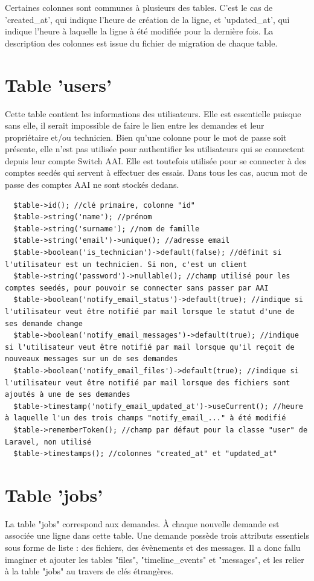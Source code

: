 \documentclass[
    iai, %
    eai, %
]{heig-tb}
\begin{document}
Certaines colonnes sont communes à plusieurs des tables. C'est le cas de 'created\_at', qui indique l'heure de création de la ligne, et 'updated\_at', qui indique l'heure à laquelle la ligne à été modifiée pour la dernière fois. La description des colonnes est issue du fichier de migration de chaque table.

\section{Table 'users'}
Cette table contient les informations des utilisateurs. Elle est essentielle puisque sans elle, il serait impossible de faire le lien entre les demandes et leur propriétaire et/ou technicien.
Bien qu'une colonne pour le mot de passe soit présente, elle n'est pas utilisée pour authentifier les utilisateurs qui se connectent depuis leur compte Switch AAI. Elle est toutefois utilisée pour se connecter à des comptes seedés qui servent à effectuer des essais. Dans tous les cas, aucun mot de passe des comptes AAI ne sont stockés dedans.

\begin{verbatim}
  $table->id(); //clé primaire, colonne "id"
  $table->string('name'); //prénom
  $table->string('surname'); //nom de famille
  $table->string('email')->unique(); //adresse email
  $table->boolean('is_technician')->default(false); //définit si l'utilisateur est un technicien. Si non, c'est un client
  $table->string('password')->nullable(); //champ utilisé pour les comptes seedés, pour pouvoir se connecter sans passer par AAI
  $table->boolean('notify_email_status')->default(true); //indique si l'utilisateur veut être notifié par mail lorsque le statut d'une de ses demande change
  $table->boolean('notify_email_messages')->default(true); //indique si l'utilisateur veut être notifié par mail lorsque qu'il reçoit de nouveaux messages sur un de ses demandes
  $table->boolean('notify_email_files')->default(true); //indique si l'utilisateur veut être notifié par mail lorsque des fichiers sont ajoutés à une de ses demandes
  $table->timestamp('notify_email_updated_at')->useCurrent(); //heure à laquelle l'un des trois champs "notify_email_..." à été modifié
  $table->rememberToken(); //champ par défaut pour la classe "user" de Laravel, non utilisé
  $table->timestamps(); //colonnes "created_at" et "updated_at"
\end{verbatim}

\section{Table 'jobs'}
La table "jobs" correspond aux demandes. À chaque nouvelle demande est associée une ligne dans cette table. Une demande possède trois attributs essentiels sous forme de liste : des fichiers, des évènements et des messages. Il a donc fallu imaginer et ajouter les tables "files", "timeline\_events" et "messages", et les relier à la table "jobs" au travers de clés étrangères.
\end{document}
